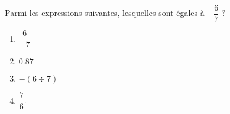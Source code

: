 
\begin{exercice}\label{exosmath-0772}

    Parmi les expressions suivantes, lesquelles sont égales à \( -\dfrac{ 6 }{ 7 }\) ?
    \begin{multicols}{2}
        \begin{enumerate}
            \item
                \( \dfrac{ 6 }{ -7 }\)
            \item
                \( 0.87\)
            \item
                \( -(6\div 7)\)
            \item
                \( \dfrac{ 7 }{ 6 }\).
        \end{enumerate}
    \end{multicols}

\end{exercice}
